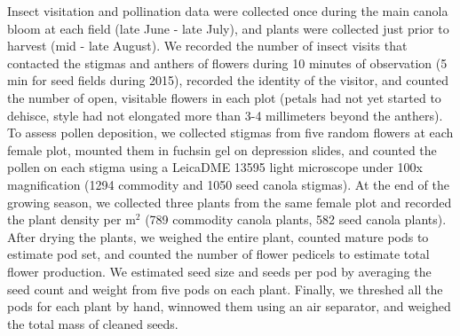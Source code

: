 \documentclass[12pt]{article} %
\begin{document}
Insect visitation and pollination data were collected once during the main canola bloom at each field (late June - late July), and plants were collected just prior to harvest (mid - late August).
We recorded the number of insect visits that contacted the stigmas and anthers of flowers during 10 minutes of observation (5 min for seed fields during 2015), recorded the identity of the visitor, and counted the number of open, visitable flowers in each plot (petals had not yet started to dehisce, style had not elongated more than 3-4 millimeters beyond the anthers).
To assess pollen deposition, we collected stigmas from five random flowers at each female plot, mounted them in fuchsin gel \citep{beattie1971} on depression slides, and counted the pollen on each stigma using a Leica\texttrademark DME 13595 light microscope under 100x magnification (1294 commodity and 1050 seed canola stigmas).
At the end of the growing season, we collected three plants from the same female plot and recorded the plant density per m$^2$ (789 commodity canola plants, 582 seed canola plants).
After drying the plants, we weighed the entire plant, counted mature pods to estimate pod set, and counted the number of flower pedicels to estimate total flower production. %
We estimated seed size and seeds per pod by averaging the seed count and weight from five pods on each plant.
Finally, we threshed all the pods for each plant by hand, winnowed them using an air separator, and weighed the total mass of cleaned seeds. %
\end{document}
